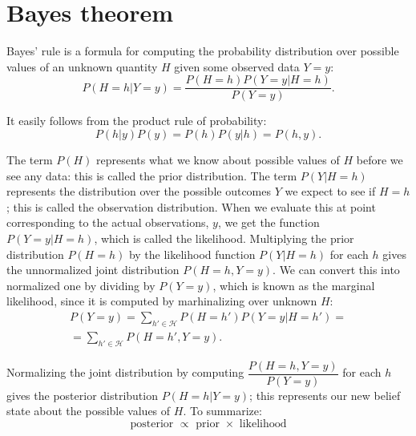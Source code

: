 \section{Bayes theorem}
\par 
Bayes' rule is a formula for computing the probability distribution over possible values of an unknown quantity $H$ given some observed data $Y = y$:
\[
    P(H = h| Y = y) = \dfrac{P(H = h)P(Y = y | H = h)}{P(Y = y)}.  
\]
\par 
It easily follows from the product rule of probability:
\[
    P(h| y)P(y) = P(h)P(y|h) = P(h, y).
\]
\par 
The term $P(H)$ represents what we know about possible values of $H$ before we see any data: this is called the prior distribution. The term $P(Y | H = h)$ represents the distribution over the possible outcomes $Y$ we expect to see if $H = h$; this is called the observation distribution. When we evaluate this at point corresponding to the actual observations, $y$, we get the function $P(Y = y| H = h)$, which is called the likelihood. Multiplying the prior distribution $P(H = h)$ by the likelihood function $P(Y | H = h)$ for each $h$ gives the unnormalized joint distribution $P(H = h, Y = y)$. We can convert this into normalized one by dividing by $P(Y = y)$, which is known as the marginal likelihood, since it is computed by marhinalizing over unknown $H$:
\[
    \begin{array}{c}
    P(Y = y) = \sum \limits_{h' \in \mathcal{H}} P(H = h')P(Y = y| H = h') = \\ =  \sum \limits_{h' \in \mathcal{H}} P(H = h', Y = y).
    \end{array}
\]
\par 
Normalizing the joint distribution by computing $\dfrac{P(H = h, Y = y)}{P(Y =y)}$ for each $h$ gives the posterior distribution $P(H = h| Y = y)$; this represents our new belief state about the possible values of $H$. To summarize:
\[
    \text{posterior } \propto \text{ prior }  \times \text{ likelihood} 
\]